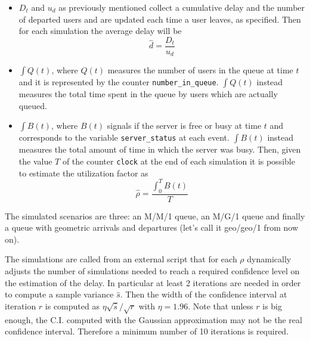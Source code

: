 \documentclass[10pt]{article}
\begin{document}
\begin{itemize}
\item $D_t$ and $u_d$ as previously mentioned collect a cumulative delay and the number of departed users and are updated each time a user leaves, as specified. Then for each simulation the average delay will be
\begin{equation}
	\hat{d} = \frac{D_t}{u_d}
\end{equation}
\item $\int Q(t)$, where $Q(t)$ measures the number of users in the queue at time $t$ and it is represented by the counter \texttt{number\_in\_queue}. $\int Q(t)$ instead measures the total time spent in the queue by users which are actually queued. 
\item $\int B(t)$, where $B(t)$ signals if the server is free or busy at time $t$ and corresponds to the variable \texttt{server\_status} at each event. $\int B(t)$ instead measures the total amount of time in which the server was busy. Then, given the value $T$ of the counter \texttt{clock} at the end of each simulation it is possible to estimate the utilization factor as 
\begin{equation}
	\hat{\rho} = \frac{\int_0^T B(t)}{T}
	\label{eq:rho}
\end{equation}
\end{itemize}

The simulated scenarios are three: an M/M/1 queue, an M/G/1 queue and finally a queue with geometric arrivals and departures (let's call it geo/geo/1 from now on). 

The simulations are called from an external script that for each $\rho$ dynamically adjusts the number of simulations needed to reach a required confidence level on the estimation of the delay. In particular at least 2 iterations are needed in order to compute a sample variance $\hat{s}$. Then the width of the confidence interval at iteration $r$ is computed as $\eta \sqrt{\hat{s}} / \sqrt{r}$ with $\eta = 1.96$. Note that unless $r$ is big enough, the C.I. computed with the Gaussian approximation may not be the real confidence interval. Therefore a minimum number of 10 iterations is required. 
\end{document}
